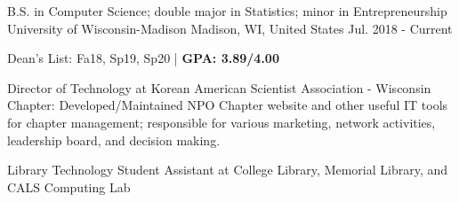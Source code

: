 

\begin{cventries}

  \cventry
  {B.S. in Computer Science; double major in Statistics; minor in Entrepreneurship} %
  {University of Wisconsin-Madison} %
  {Madison, WI, United States} %
  {Jul. 2018 - Current} %
  {
    \begin{cvitems} %
      \item {Dean's List: Fa18, Sp19, Sp20 | \textbf{GPA: 3.89/4.00}}
      \item {Director of Technology at Korean American Scientist Association - Wisconsin Chapter: Developed/Maintained NPO Chapter website and other useful IT tools for chapter management; responsible for various marketing, network activities, leadership board, and decision making.}
      \item {Library Technology Student Assistant at College Library, Memorial Library, and CALS Computing Lab}
    \end{cvitems}
  }

\end{cventries}
